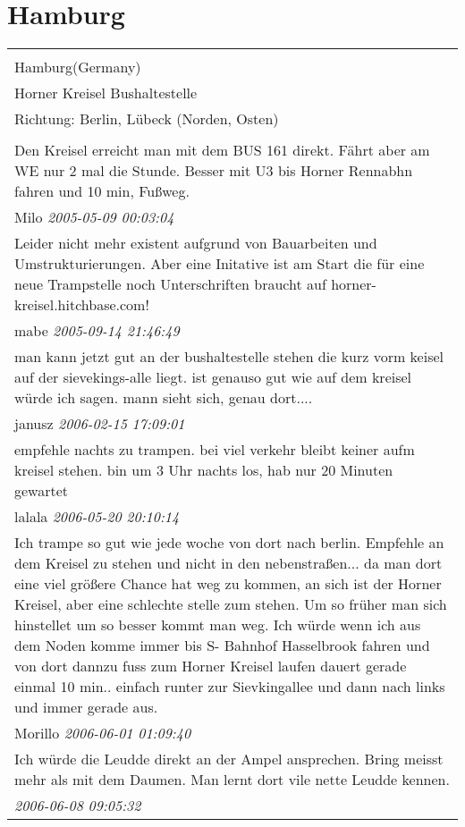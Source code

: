 \documentclass[a4paper,12pt]{article}
\begin{document}
\section{Hamburg}
\begin{tabular}{|p{13cm}|}
\hline\\
Hamburg(Germany)\\
Horner Kreisel Bushaltestelle\\
Richtung: Berlin, Lübeck (Norden, Osten) \\
\hline\\
Den Kreisel erreicht man mit dem BUS 161 direkt. Fährt aber am WE nur 2 mal die Stunde. Besser mit U3 bis Horner Rennabhn fahren und 10 min, Fußweg. \\
Milo \textit{ 2005-05-09 00:03:04 }\\\hline Leider nicht mehr existent aufgrund von Bauarbeiten und Umstrukturierungen. Aber eine Initative ist am Start die für eine neue Trampstelle noch Unterschriften braucht auf horner-kreisel.hitchbase.com! \\
mabe \textit{ 2005-09-14 21:46:49 }\\\hline man kann jetzt gut an der bushaltestelle stehen die kurz vorm keisel auf der sievekings-alle liegt. ist genauso gut wie auf dem kreisel würde ich sagen. mann sieht sich, genau dort.... \\
janusz \textit{ 2006-02-15 17:09:01 }\\\hline empfehle nachts zu trampen. bei viel verkehr bleibt keiner aufm kreisel stehen. bin um 3 Uhr nachts los, hab nur 20 Minuten gewartet \\
lalala \textit{ 2006-05-20 20:10:14 }\\\hline Ich trampe so gut wie jede woche von dort nach berlin. Empfehle an dem Kreisel zu stehen und nicht in den nebenstraßen... da man dort eine viel größere Chance hat weg zu kommen, an sich ist der Horner Kreisel, aber eine schlechte stelle zum stehen.
Um so früher man sich hinstellet um so besser kommt man weg. Ich würde wenn ich aus dem Noden komme immer bis S- Bahnhof Hasselbrook fahren und von dort dannzu fuss zum Horner Kreisel laufen dauert gerade einmal 10 min.. einfach runter zur Sievkingallee und dann nach links und immer gerade aus. \\
Morillo \textit{ 2006-06-01 01:09:40 }\\\hline Ich würde die Leudde direkt an der Ampel ansprechen.
Bring meisst mehr als mit dem Daumen.
Man lernt dort vile nette Leudde kennen. \\
\textit{ 2006-06-08 09:05:32 }\\\hline
\end{tabular}
\end{document}
